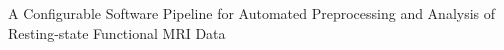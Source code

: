 A Configurable Software Pipeline for Automated Preprocessing and Analysis of Resting-state Functional MRI Data
